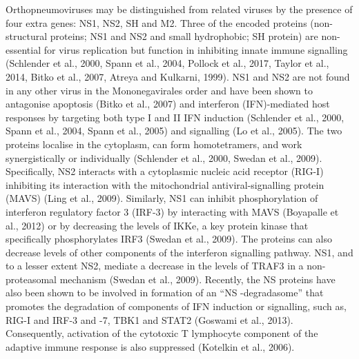 Orthopneumoviruses may be distinguished from related viruses by the presence of four extra genes: NS1, NS2, SH and M2. Three of the encoded proteins (non-structural proteins; NS1 and NS2 and small hydrophobic; SH protein) are non-essential for virus replication but function in inhibiting innate immune signalling (Schlender et al., 2000, Spann et al., 2004, Pollock et al., 2017, Taylor et al., 2014, Bitko et al., 2007, Atreya and Kulkarni, 1999). NS1 and NS2 are not found in any other virus in the Mononegavirales order and have been shown to antagonise apoptosis (Bitko et al., 2007) and interferon (IFN)-mediated host responses by targeting both type I and II IFN induction (Schlender et al., 2000, Spann et al., 2004, Spann et al., 2005) and signalling (Lo et al., 2005). The two proteins localise in the cytoplasm, can form homotetramers, and work synergistically or individually (Schlender et al., 2000, Swedan et al., 2009). Specifically, NS2 interacts with a cytoplasmic nucleic acid receptor (RIG-I) inhibiting its interaction with the mitochondrial antiviral-signalling protein (MAVS) (Ling et al., 2009). Similarly, NS1 can inhibit phosphorylation of interferon regulatory factor 3 (IRF-3) by interacting with MAVS (Boyapalle et al., 2012) or by decreasing the levels of IKKe, a key protein kinase that specifically phosphorylates IRF3 (Swedan et al., 2009). The proteins can also decrease levels of other components of the interferon signalling pathway. NS1, and to a lesser extent NS2, mediate a decrease in the levels of TRAF3 in a non-proteasomal mechanism (Swedan et al., 2009). Recently, the NS proteins have also been shown to be involved in formation of an “NS -degradasome” that promotes the degradation of components of IFN induction or signalling, such as, RIG-I and IRF-3 and -7, TBK1 and STAT2 (Goswami et al., 2013). Consequently, activation of the cytotoxic T lymphocyte component of the adaptive immune response is also suppressed (Kotelkin et al., 2006).

